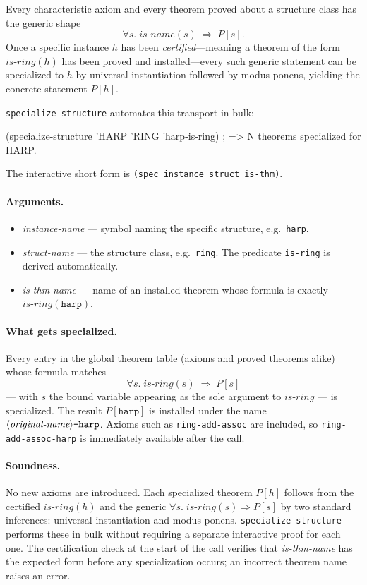 Every characteristic axiom and every theorem proved about a structure class
has the generic shape
\[
  \forall s.\;\mathit{is\text{-}name}(s) \;\Rightarrow\; P[s].
\]
Once a specific instance $h$ has been \emph{certified}---meaning a theorem
of the form $\mathit{is\text{-}ring}(h)$ has been proved and installed---every
such generic statement can be specialized to $h$ by universal instantiation
followed by modus ponens, yielding the concrete statement $P[h]$.

\texttt{specialize-structure} automates this transport in bulk:

\begin{VNBcode}
(specialize-structure 'HARP 'RING 'harp-is-ring)
; => N theorems specialized for HARP.
\end{VNBcode}

The interactive short form is \texttt{(spec instance struct is-thm)}.

\paragraph{Arguments.}
\begin{itemize}
\item \textit{instance-name} --- symbol naming the specific structure, e.g.\
  \texttt{harp}.
\item \textit{struct-name} --- the structure class, e.g.\ \texttt{ring}.
  The predicate \texttt{is-ring} is derived automatically.
\item \textit{is-thm-name} --- name of an installed theorem
  whose formula is exactly $\mathit{is\text{-}ring}(\mathtt{harp})$.
\end{itemize}

\paragraph{What gets specialized.}
Every entry in the global theorem table (axioms and proved theorems alike)
whose formula matches
\[
  \forall s.\;\mathit{is\text{-}ring}(s) \;\Rightarrow\; P[s]
\]
--- with $s$ the bound variable appearing as the sole argument to
$\mathit{is\text{-}ring}$ --- is specialized.  The result $P[\mathtt{harp}]$
is installed under the name
$\langle\textit{original\text{-}name}\rangle\texttt{-harp}$.
Axioms such as \texttt{ring-add-assoc} are included, so
\texttt{ring-add-assoc-harp} is immediately available after the call.

\paragraph{Soundness.}
No new axioms are introduced.  Each specialized theorem $P[h]$ follows
from the certified $\mathit{is\text{-}ring}(h)$ and the generic
$\forall s.\;\mathit{is\text{-}ring}(s)\Rightarrow P[s]$ by two standard
inferences: universal instantiation and modus ponens.
\texttt{specialize-structure} performs these in bulk without requiring a
separate interactive proof for each one.  The certification check at the
start of the call verifies that \textit{is-thm-name} has the expected form
before any specialization occurs; an incorrect theorem name raises an error.


